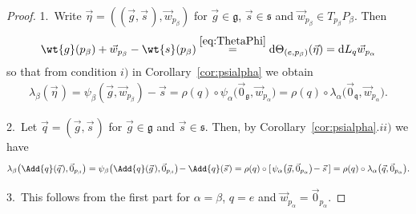 \documentclass[pdftex]{sigma}
\numberwithin{equation}{section}
\begin{document}
\begin{proof}
1.~Write $\vec{\eta}=((\vec{g},\vec{s}\hspace{1pt}),\vec{w}_{p_\beta})$ for $\vec{g}\in\mathfrak{g}$, $\vec{s}\in\mathfrak{s}$ and
$\vec{w}_{p_\beta}\in T_{p_\beta}P_\beta$.
Then
\begin{gather*}
\wt{g}(p_\beta)
+\vec{w}_{p_\beta}-\wt{s}(p_\beta)\stackrel{\eqref{eq:ThetaPhi}}{=}\mathrm{d}\Theta_{(e,p_\beta)}(\vec{\eta})=\mathrm{d}
L_q\vec{w}_{p_\alpha}
\end{gather*}
so that from condition $i)$ in Corollary~\ref{cor:psialpha} we obtain
\begin{gather*}
\lambda_\beta(\vec{\eta}\hspace{1pt})=\psi_\beta(\vec{g},\vec{w}_{p_\beta})-\vec{s}
=\rho(q)\circ\psi_\alpha\big(\vec{0}_{\mathfrak{g}},\vec{w}_{p_\alpha}\big)
=\rho(q)\circ\lambda_\alpha\big(\vec{0}_{\mathfrak{q}},
\vec{w}_{p_\alpha}\big).
\end{gather*}

2.~Let $\vec{q}=(\vec{g},\vec{s}\hspace{1pt})$ for $\vec{g}\in\mathfrak{g}$ and $\vec{s}\in \mathfrak{s}$.
Then, by Corollary~\ref{cor:psialpha}.$ii)$ we have
\begin{gather*}
\lambda_\beta\big(\Add{q}(\vec{q}\hspace{1pt}),\vec{0}_{p_\beta}\big)=\psi_\beta\big(\Add{q}(\vec{g}\hspace{1pt}),\vec{0}_{p_\beta}\big)\!-
\Add{q}(\vec{s}\hspace{1pt})
=\rho(q)\circ [\hspace{1pt}\psi_\alpha\big(\vec{g},\vec{0}_{p_\alpha}\big)\!- \vec{s}\hspace{2pt}] =\rho(q) \circ
\lambda_\alpha\big(\vec{q},\vec{0}_{p_\alpha}\big).
\end{gather*}

3.~This follows from the f\/irst part for $\alpha=\beta$, $q=e$ and $\vec{w}_{p_\alpha}=\vec{0}_{p_\alpha}$.


\end{proof}
\end{document}
